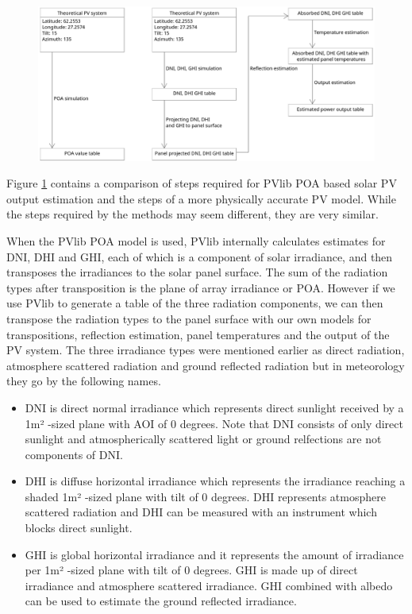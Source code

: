 \begin{figure}[h]
\centering
\includegraphics[width=1.0\linewidth]{pics/uml2}
\label{fig-pv_model}
\end{figure}


\noindent 
Figure \ref{fig-pv_model} contains a comparison of steps required for PVlib POA based solar PV output estimation and the steps of a more physically accurate PV model. While the steps required by the methods may seem different, they are very similar.

When the PVlib POA model is used, PVlib internally calculates estimates for \gls{DNI}, \gls{DHI} and \gls{GHI}, each of which is a component of solar irradiance, and then transposes the irradiances to the solar panel surface. The sum of the radiation types after transposition is the plane of array irradiance or POA. However if we use PVlib to generate a table of the three radiation components, we can then transpose the radiation types to the panel surface with our own models for transpositions, reflection estimation, panel temperatures and the output of the PV system. The three irradiance types were mentioned earlier as direct radiation, atmosphere scattered radiation and ground reflected radiation but in meteorology they go by the following names.



\begin{itemize}
\item DNI is direct normal irradiance which represents direct sunlight received by a 1m² -sized plane with AOI of 0 degrees. Note that DNI consists of only direct sunlight and atmospherically scattered light or ground relfections are not components of DNI.

\item DHI is diffuse horizontal irradiance which represents the irradiance reaching a shaded 1m² -sized plane with tilt of 0 degrees. DHI represents atmosphere scattered radiation and DHI can be measured with an instrument which blocks direct sunlight.

\item GHI is global horizontal irradiance and it represents the amount of irradiance per 1m² -sized plane with tilt of 0 degrees. GHI is made up of direct irradiance and atmosphere scattered irradiance. GHI combined with albedo can be used to estimate the ground reflected irradiance.
\end{itemize}

